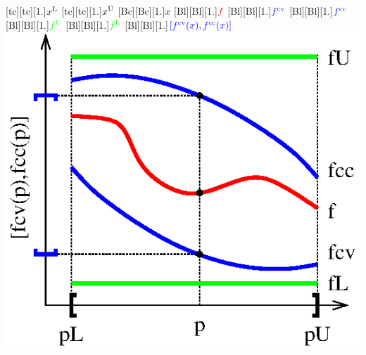 \documentclass[a4paper,12pt]{article}
\begin{document}
[tc][tc][1.]{$x^{\rm L}$}
[tc][tc][1.]{$x^{\rm U}$}
[Bc][Bc][1.]{$x$}
[Bl][Bl][1.]{$\color{red}f$}
[Bl][Bl][1.]{$\color{blue}f^{\rm cv}$}
[Bl][Bl][1.]{$\color{blue}f^{\rm cc}$}
[Bl][Bl][1.]{$\color{green}f^{\rm U}$}
[Bl][Bl][1.]{$\color{green}f^{\rm L}$}
[Bl][Bl][1.]{$\color{blue}[f^{\rm cv}(x),f^{\rm cc}(x)]$}
\includegraphics[width=.45\textwidth]{McCormickrelax.eps}
\end{document}
